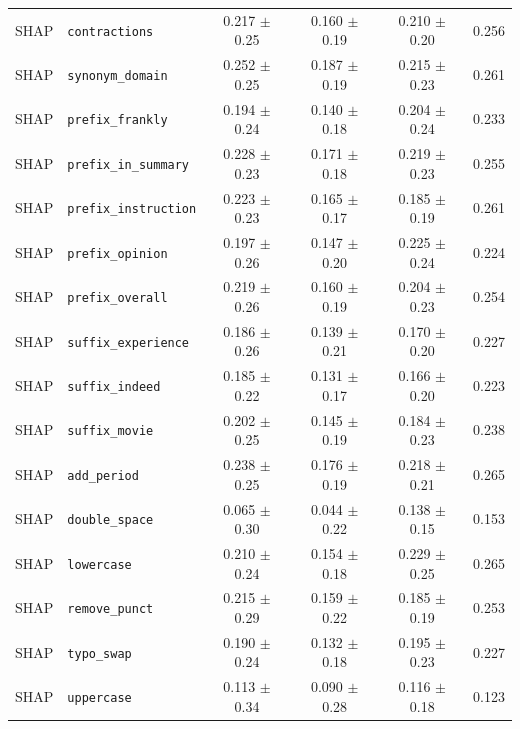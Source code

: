 \begin{table}[htbp]
\begin{tabular}{llcccc}
\hline
SHAP & \texttt{contractions} & 0.217 $\pm$ 0.25 & 0.160 $\pm$ 0.19 & 0.210 $\pm$ 0.20 & 0.256 \\
SHAP & \texttt{synonym\_domain} & 0.252 $\pm$ 0.25 & 0.187 $\pm$ 0.19 & 0.215 $\pm$ 0.23 & 0.261 \\
SHAP & \texttt{prefix\_frankly} & 0.194 $\pm$ 0.24 & 0.140 $\pm$ 0.18 & 0.204 $\pm$ 0.24 & 0.233 \\
SHAP & \texttt{prefix\_in\_summary} & 0.228 $\pm$ 0.23 & 0.171 $\pm$ 0.18 & 0.219 $\pm$ 0.23 & 0.255 \\
SHAP & \texttt{prefix\_instruction} & 0.223 $\pm$ 0.23 & 0.165 $\pm$ 0.17 & 0.185 $\pm$ 0.19 & 0.261 \\
SHAP & \texttt{prefix\_opinion} & 0.197 $\pm$ 0.26 & 0.147 $\pm$ 0.20 & 0.225 $\pm$ 0.24 & 0.224 \\
SHAP & \texttt{prefix\_overall} & 0.219 $\pm$ 0.26 & 0.160 $\pm$ 0.19 & 0.204 $\pm$ 0.23 & 0.254 \\
SHAP & \texttt{suffix\_experience} & 0.186 $\pm$ 0.26 & 0.139 $\pm$ 0.21 & 0.170 $\pm$ 0.20 & 0.227 \\
SHAP & \texttt{suffix\_indeed} & 0.185 $\pm$ 0.22 & 0.131 $\pm$ 0.17 & 0.166 $\pm$ 0.20 & 0.223 \\
SHAP & \texttt{suffix\_movie} & 0.202 $\pm$ 0.25 & 0.145 $\pm$ 0.19 & 0.184 $\pm$ 0.23 & 0.238 \\
SHAP & \texttt{add\_period} & 0.238 $\pm$ 0.25 & 0.176 $\pm$ 0.19 & 0.218 $\pm$ 0.21 & 0.265 \\
SHAP & \texttt{double\_space} & 0.065 $\pm$ 0.30 & 0.044 $\pm$ 0.22 & 0.138 $\pm$ 0.15 & 0.153 \\
SHAP & \texttt{lowercase} & 0.210 $\pm$ 0.24 & 0.154 $\pm$ 0.18 & 0.229 $\pm$ 0.25 & 0.265 \\
SHAP & \texttt{remove\_punct} & 0.215 $\pm$ 0.29 & 0.159 $\pm$ 0.22 & 0.185 $\pm$ 0.19 & 0.253 \\
SHAP & \texttt{typo\_swap} & 0.190 $\pm$ 0.24 & 0.132 $\pm$ 0.18 & 0.195 $\pm$ 0.23 & 0.227 \\
SHAP & \texttt{uppercase} & 0.113 $\pm$ 0.34 & 0.090 $\pm$ 0.28 & 0.116 $\pm$ 0.18 & 0.123 \\
\hline
\end{tabular}
\end{table}
